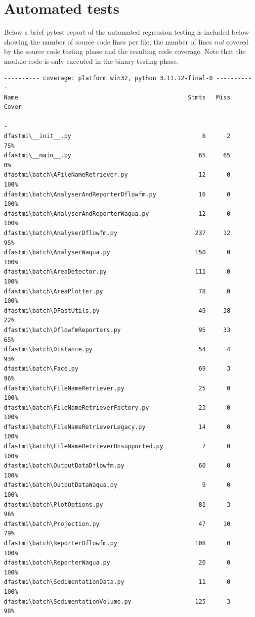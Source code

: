 \section{Automated tests}

Below a brief pytest report of the automated regression testing is included below showing the number of source code lines per file, the number of lines \emph{not} covered by the source code testing phase and the resulting code coverage.
Note that the  module code is only executed in the binary testing phase.

\begin{Verbatim}
---------- coverage: platform win32, python 3.11.12-final-0 -----------
Name                                                Stmts   Miss  Cover
-----------------------------------------------------------------------
dfastmi\__init__.py                                     8      2    75%
dfastmi\__main__.py                                    65     65     0%
dfastmi\batch\AFileNameRetriever.py                    12      0   100%
dfastmi\batch\AnalyserAndReporterDflowfm.py            16      0   100%
dfastmi\batch\AnalyserAndReporterWaqua.py              12      0   100%
dfastmi\batch\AnalyserDflowfm.py                      237     12    95%
dfastmi\batch\AnalyserWaqua.py                        150      0   100%
dfastmi\batch\AreaDetector.py                         111      0   100%
dfastmi\batch\AreaPlotter.py                           78      0   100%
dfastmi\batch\DFastUtils.py                            49     38    22%
dfastmi\batch\DflowfmReporters.py                      95     33    65%
dfastmi\batch\Distance.py                              54      4    93%
dfastmi\batch\Face.py                                  69      3    96%
dfastmi\batch\FileNameRetriever.py                     25      0   100%
dfastmi\batch\FileNameRetrieverFactory.py              23      0   100%
dfastmi\batch\FileNameRetrieverLegacy.py               14      0   100%
dfastmi\batch\FileNameRetrieverUnsupported.py           7      0   100%
dfastmi\batch\OutputDataDflowfm.py                     60      0   100%
dfastmi\batch\OutputDataWaqua.py                        9      0   100%
dfastmi\batch\PlotOptions.py                           81      3    96%
dfastmi\batch\Projection.py                            47     10    79%
dfastmi\batch\ReporterDflowfm.py                      108      0   100%
dfastmi\batch\ReporterWaqua.py                         20      0   100%
dfastmi\batch\SedimentationData.py                     11      0   100%
dfastmi\batch\SedimentationVolume.py                  125      3    98%

\end{Verbatim}
